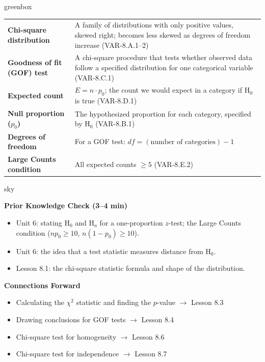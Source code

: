 \documentclass[10pt]{article}
\begin{document}
\begin{skillbox}{greenbox}
\renewcommand{\arraystretch}{1.3}
\begin{tabularx}{\linewidth}{lX}
    \textbf{Chi-square distribution} &
        A family of distributions with only positive values, skewed right; becomes
        less skewed as degrees of freedom increase (VAR-8.A.1--2) \\
    \textbf{Goodness of fit (GOF) test} &
        A chi-square procedure that tests whether observed data follow a specified
        distribution for one categorical variable (VAR-8.C.1) \\
    \textbf{Expected count} &
        $E = n \cdot p_0$; the count we would expect in a category if H$_0$ is true
        (VAR-8.D.1) \\
    \textbf{Null proportion ($p_0$)} &
        The hypothesized proportion for each category, specified by H$_0$ (VAR-8.B.1) \\
    \textbf{Degrees of freedom} &
        For a GOF test: $df = (\text{number of categories}) - 1$ \\
    \textbf{Large Counts condition} &
        All expected counts $\ge 5$ (VAR-8.E.2) \\
\end{tabularx}
\end{skillbox}

\begin{skillbox}{sky}
\begin{minipage}[t]{0.48\linewidth}
    \textbf{Prior Knowledge Check (3--4 min)}
    \begin{itemize}
        \item Unit 6: stating H$_0$ and H$_a$ for a one-proportion $z$-test; the Large
              Counts condition ($np_0 \ge 10$, $n(1-p_0) \ge 10$).
        \item Unit 6: the idea that a test statistic measures distance from H$_0$.
        \item Lesson 8.1: the chi-square statistic formula and shape of the distribution.
    \end{itemize}
\end{minipage}
\hfill
\begin{minipage}[t]{0.48\linewidth}
    \textbf{Connections Forward}
    \begin{itemize}
        \item Calculating the $\chi^2$ statistic and finding the $p$-value $\to$ Lesson 8.3
        \item Drawing conclusions for GOF tests $\to$ Lesson 8.4
        \item Chi-square test for homogeneity $\to$ Lesson 8.6
        \item Chi-square test for independence $\to$ Lesson 8.7
    \end{itemize}
\end{minipage}
\end{skillbox}
\end{document}
